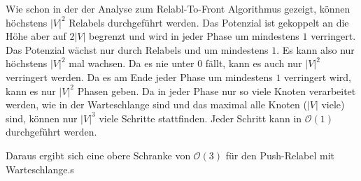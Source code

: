 \documentclass[parskip=half,a4paper]{scrartcl}
\begin{document}
Wie schon in der der Analyse zum Relabl-To-Front Algorithmus gezeigt, können höchstens $|V|^2$ Relabels durchgeführt werden. Das Potenzial ist gekoppelt an die Höhe aber auf $2|V|$ begrenzt und wird in jeder Phase um mindestens $1$ verringert. Das Potenzial wächst nur durch Relabels und um mindestens $1$. Es kann also nur höchstens $|V|^2$ mal wachsen. Da es nie unter $0$ fällt, kann es auch nur $|V|^2$ verringert werden. Da es am Ende jeder Phase um mindestens $1$ verringert wird, kann es nur $|V|^2$ Phasen geben. Da in jeder Phase nur so viele Knoten verarbeitet werden, wie in der Warteschlange sind und das maximal alle Knoten ($|V|$ viele) sind, können nur $|V|^3$ viele Schritte stattfinden. Jeder Schritt kann in $\mathcal{O}(1)$ durchgeführt werden.

Daraus ergibt sich eine obere Schranke von $\mathcal{O}(3)$ für den Push-Relabel mit Warteschlange.s
\end{document}
